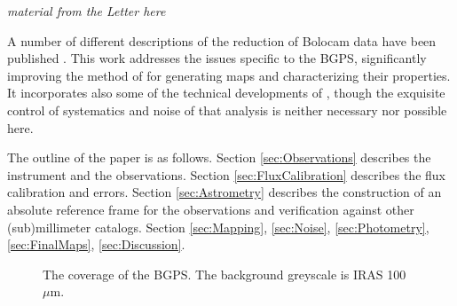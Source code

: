 \documentclass[12pt,preprint]{aastex}
\newcommand{\mum}{\ensuremath{\mu \mathrm{m}}}
\def\Figure#1#2#3#4{
\begin{figure}[htb]
\epsscale{#4}
\plotone{#1}
\caption{#2}
\label{#3}
\end{figure}
}
\begin{document}
{\it material from the Letter here}

A number of different descriptions of the reduction of Bolocam data
have been published \citep{laurent05,enoch06,sayers09}.  This work
addresses the issues specific to the BGPS, significantly improving the
method of \citet{enoch06} for generating maps and characterizing their
properties.  It incorporates also some of the technical developments
of \citet{sayers09}, though the exquisite control of systematics and
noise of that analysis is neither necessary nor possible here.

The outline of the paper is as follows. Section \ref{sec:Observations}
describes the instrument and the observations.  Section
\ref{sec:FluxCalibration} describes the flux calibration and errors.
Section \ref{sec:Astrometry} describes the construction of an absolute
reference frame for the observations and verification against other
(sub)millimeter catalogs.  Section \ref{sec:Mapping}, \ref{sec:Noise},
\ref{sec:Photometry}, \ref{sec:FinalMaps}, \ref{sec:Discussion}.



%
\Figure{coverage_moll} {The coverage of the BGPS.  The background
greyscale is IRAS 100 \mum.  
}{fig:Coverage}{1.0}
\end{document}
